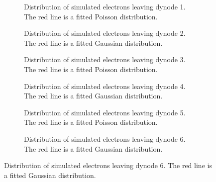 \begin{figure}
\centering
\begin{subfigure}[b]{0.44\textwidth}
\caption{Distribution of simulated electrons leaving dynode 1. The red line is a fitted Poisson distribution.}
\end{subfigure}
\hspace{3mm}
\begin{subfigure}[b]{0.44\textwidth}
\caption{Distribution of simulated electrons leaving dynode 2. The red line is a fitted Gaussian distribution.}
\end{subfigure}

\vspace{3mm}

\begin{subfigure}[b]{0.44\textwidth}
\caption{Distribution of simulated electrons leaving dynode 3. The red line is a fitted Poisson distribution.}
\end{subfigure}
\hspace{3mm}
\begin{subfigure}[b]{0.44\textwidth}
\caption{Distribution of simulated electrons leaving dynode 4. The red line is a fitted Gaussian distribution.}
\end{subfigure}

\vspace{3mm}

\begin{subfigure}[b]{0.44\textwidth}
\caption{Distribution of simulated electrons leaving dynode 5. The red line is a fitted Poisson distribution.}
\end{subfigure}
\hspace{3mm}
\begin{subfigure}[b]{0.44\textwidth}
\caption{Distribution of simulated electrons leaving dynode 6. The red line is a fitted Gaussian distribution.}
\end{subfigure}


\end{figure}
